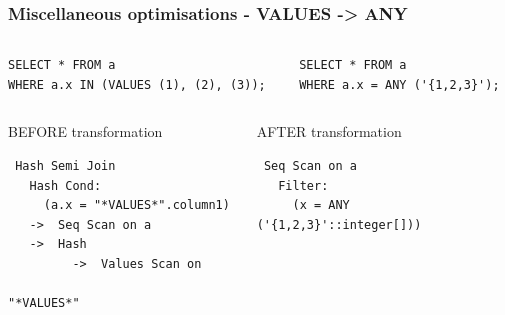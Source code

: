 \documentclass{beamer}
\begin{document}
\begin{frame}[fragile]\frametitle{Miscellaneous optimisations - VALUES -> ANY}
\begin{columns}[T]\begin{column}{0.5\textwidth}
\begin{lstlisting}
SELECT * FROM a
WHERE a.x IN (VALUES (1), (2), (3));
\end{lstlisting}
\end{column}\begin{column}{0.5\textwidth}
\begin{lstlisting}
SELECT * FROM a
WHERE a.x = ANY ('{1,2,3}');
\end{lstlisting}
\end{column}\end{columns}
\begin{columns}[T]\begin{column}{0.5\textwidth}
\begin{block}{BEFORE transformation}
\begin{lstlisting}
 Hash Semi Join
   Hash Cond:
     (a.x = "*VALUES*".column1)
   ->  Seq Scan on a
   ->  Hash
         ->  Values Scan on
                       "*VALUES*"
\end{lstlisting}
\end{block}
\vspace*{\fill}
\end{column}\begin{column}{0.5\textwidth}
\begin{block}{AFTER transformation}
\begin{lstlisting}
 Seq Scan on a
   Filter:
     (x = ANY ('{1,2,3}'::integer[]))
\end{lstlisting}
\end{block}
\vspace*{\fill}
\end{column}\end{columns}
\end{frame}
\end{document}

